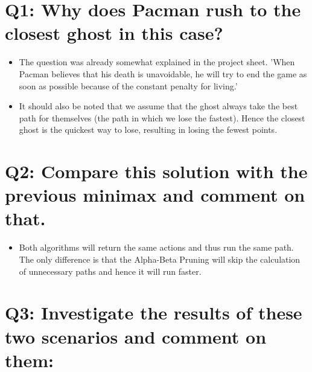 


\newcommand{\veranstaltung}{Künstliche Intelligenz}
\newcommand{\semester}{SoSe21}
\newcommand{\studenten}{Jonny Lam \& Thore Brehmer}
\newcommand{\ubungNo}{2}





\section{Q1: Why does Pacman rush to the closest ghost in this case?}
\begin{itemize}
    \item The question was already somewhat explained in the project sheet. 'When Pacman believes that his death is unavoidable, he will try to end the game as soon as possible because of the constant penalty for living.'
    \item It should also be noted that we assume that the ghost always take the best path for themselves (the path in which we lose the fastest). Hence the closest ghost is the quickest way to lose, resulting in losing the fewest points.
\end{itemize}

\section{Q2: Compare this solution with the previous minimax and comment on that.}
\begin{itemize}
    \item Both algorithms will return the same actions and thus run the same path. The only difference is that the Alpha-Beta Pruning will skip the calculation of unnecessary paths and hence it will run faster.
\end{itemize}


\newpage
\section{Q3: Investigate the results of these two scenarios and comment on them:}


